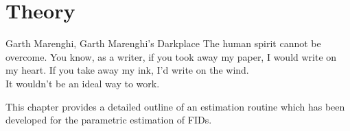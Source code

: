 \chapter{Theory}
\label{chap:theory}

\begin{chapterquote}{Garth Marenghi, Garth Marenghi's Darkplace}
    The human spirit cannot be overcome. You know, as a writer, if you took away my paper, I would write on my heart. If you take away my ink, I'd write on the wind.\vspace*{1em}\\
    It wouldn't be an ideal way to work.
\end{chapterquote}

This chapter provides a detailed outline of an estimation routine which has
been developed for the parametric estimation of \acp{FID}. 







